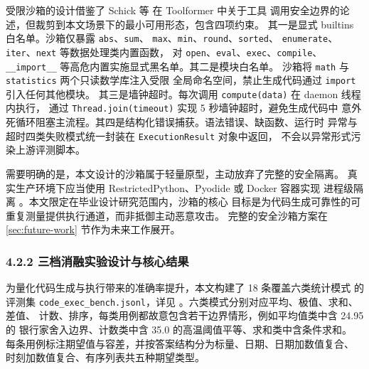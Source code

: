 受限沙箱的设计借鉴了 Schick 等 \cite{ref21} 在 Toolformer 中关于工具
调用安全边界的论述，但裁剪到本文场景下的最小可用形态，包含四项约束。
其一是显式 builtins 白名单。沙箱仅暴露 \texttt{abs}、\texttt{sum}、
\texttt{max}、\texttt{min}、\texttt{round}、\texttt{sorted}、
\texttt{enumerate}、\texttt{iter}、\texttt{next} 等数据处理类内置函数，
对 \texttt{open}、\texttt{eval}、\texttt{exec}、\texttt{compile}、
\texttt{\_\bk{}\_\bk{}import\_\bk{}\_\bk{}} 等高危内置实施显式黑名单。其二是模块白名单。
沙箱将 \texttt{math} 与 \texttt{statistics} 两个只读数学库注入受限
全局命名空间，禁止生成代码通过 \texttt{import} 引入任何其他模块。
其三是墙钟超时。每次调用 \texttt{compute(data)} 在 daemon 线程内执行，
通过 \texttt{Thread.\bk{}join(timeout)} 实现 5 秒墙钟超时，避免生成代码中
意外死循环阻塞主流程。其四是结构化错误捕获。语法错误、缺函数、运行时
异常与超时四类失败模式统一封装在 \texttt{ExecutionResult} 对象中返回，
不会以异常形式污染上游评测脚本。

需要明确的是，本文设计的沙箱属于轻量原型，主动放弃了完整的安全隔离。
真实生产环境下应当使用 RestrictedPython、Pyodide 或 Docker 容器实现
进程级隔离 \cite{ref23}。本文限定在毕业设计研究范围内，沙箱的核心
目标是为代码生成可靠性的可重复测量提供执行通道，而非抵御主动恶意攻击。
完整的安全沙箱方案在 \ref{sec:future-work} 节作为未来工作展开。

\subsubsection*{4.2.2 \quad 三档消融实验设计与核心结果}

为量化代码生成与执行带来的准确率提升，本文构建了 18 条覆盖六类统计模式
的评测集 \texttt{code\_\bk{}exec\_\bk{}bench.\bk{}jsonl}，详见
。六类模式分别对应平均、极值、求和、差值、
计数、排序，每类用例都故意包含若干边界情形，例如平均值类中含 24.95 的
银行家舍入边界、计数类中含 35.0 的高温阈值平等、求和类中含条件求和。
每条用例标注期望值与容差，并按答案结构分为标量、日期、日期加数值复合、
时刻加数值复合、有序列表共五种期望类型。

